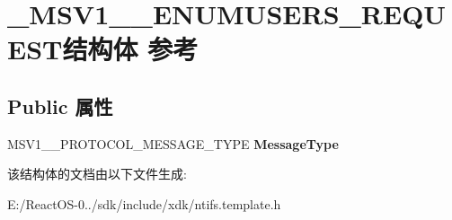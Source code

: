 \hypertarget{struct___m_s_v1__0___e_n_u_m_u_s_e_r_s___r_e_q_u_e_s_t}{}\section{\+\_\+\+M\+S\+V1\+\_\+\_\+\+E\+N\+U\+M\+U\+S\+E\+R\+S\+\_\+\+R\+E\+Q\+U\+E\+S\+T结构体 参考}
\label{struct___m_s_v1__0___e_n_u_m_u_s_e_r_s___r_e_q_u_e_s_t}
\subsection*{Public 属性}
\begin{DoxyCompactItemize}
\item 
\mbox{\label{struct___m_s_v1__0___e_n_u_m_u_s_e_r_s___r_e_q_u_e_s_t_a62e0b9ffce6756faefb230adecad74b9}} 
M\+S\+V1\+\_\+\_\+\+P\+R\+O\+T\+O\+C\+O\+L\+\_\+\+M\+E\+S\+S\+A\+G\+E\+\_\+\+T\+Y\+PE {\bfseries Message\+Type}
\end{DoxyCompactItemize}


该结构体的文档由以下文件生成\+:\begin{DoxyCompactItemize}
\item 
E\+:/\+React\+O\+S-\/0../sdk/include/xdk/ntifs.\+template.\+h\end{DoxyCompactItemize}
